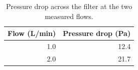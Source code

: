 \begin{table}[ht]
\centering
\caption{Pressure drop across the filter at the two measured flows.}\label{tab:drop}
\begin{tabular}{rr}
\toprule
Flow (L/min) & Pressure drop (Pa)\\
\midrule
1.0 & 12.4\\
2.0 & 21.7\\
\bottomrule
\end{tabular}
\end{table}
